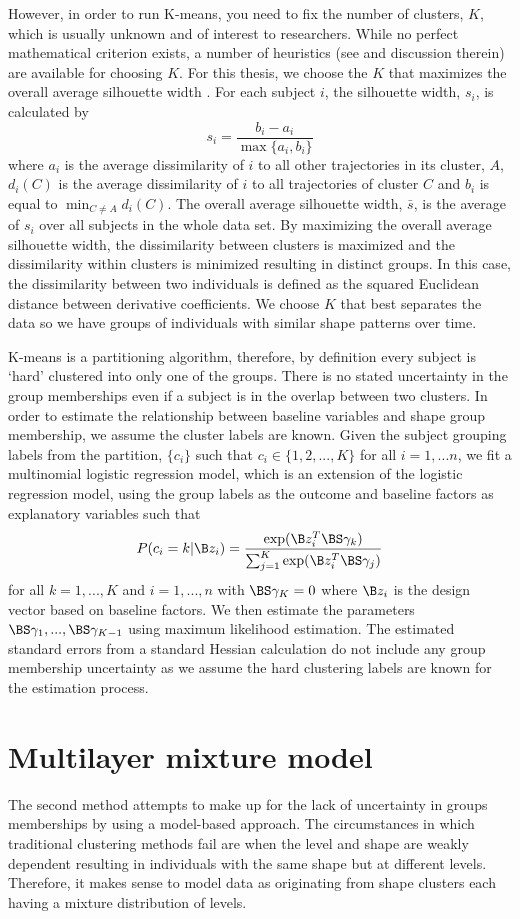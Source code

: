 However, in order to run K-means, you need to fix the number of clusters, $K$, which is usually unknown and of interest to researchers. While no perfect mathematical criterion exists, a number of heuristics (see \cite{tibshirani2001} and discussion therein) are available for choosing $K$. For this thesis, we choose the $K$ that maximizes the overall average silhouette width \cite{rousseeuw1987}.  For each subject $i$, the silhouette width, $s_{i}$, is calculated by
$$s_{i}=\frac{b_{i}-a_{i}}{\max\{a_{i},b_{i}\}}$$
where $a_{i}$ is the average dissimilarity of $i$ to all other trajectories in its cluster, $A$, $d_{i}(C)$ is the average dissimilarity of $i$ to all trajectories of cluster $C$ and $b_{i}$ is equal to $\min_{C\not= A} d_{i}(C)$. The overall average silhouette width, $\bar{s}$, is the average of $s_{i}$ over all subjects in the whole data set. By maximizing the overall average silhouette width, the dissimilarity between clusters is maximized and the dissimilarity within clusters is minimized resulting in distinct groups. In this case, the dissimilarity between two individuals is defined as the squared Euclidean distance between derivative coefficients. We choose $K$ that best separates the data so we have groups of individuals with similar shape patterns over time.

K-means is a partitioning algorithm, therefore, by definition every subject is `hard' clustered into only one of the groups. There is no stated uncertainty in the group memberships even if a subject is in the overlap between two clusters. In order to estimate the relationship between baseline variables and shape group membership, we assume the cluster labels are known. Given the subject grouping labels from the partition, $\{c_{i}\}$ such that $c_{i}\in\{1,2,...,K\}$ for all $i=1,...n$, we fit a multinomial logistic regression model, which is an extension of the logistic regression model, using the group labels as the outcome and baseline factors as explanatory variables such that
$$P(c_{i} = k|\B z_{i}) = \frac{\exp(\B z_{i}^{T}\BS\gamma_{k})}{\sum_{j=1}^{K}\exp(\B z_{i}^{T}\BS\gamma_{j})}$$
for all $k=1,...,K$ and $i=1,...,n$ with $\BS\gamma_{K}=0$ where $\B z_{i}$ is the design vector based on baseline factors. We then estimate the parameters $\BS\gamma_{1},...,\BS\gamma_{K-1}$ using maximum likelihood estimation. The estimated standard errors from a standard Hessian calculation do not include any group membership uncertainty  as we assume the hard clustering labels are known for the estimation process.
\section{Multilayer mixture model}\label{chp4:multi}
The second method attempts to make up for the lack of uncertainty in groups memberships by using a model-based approach. The circumstances in which traditional clustering methods fail are when the level and shape are weakly dependent resulting in individuals with the same shape but at different levels. Therefore, it makes sense to model data as originating from shape clusters each having a mixture distribution of levels.
